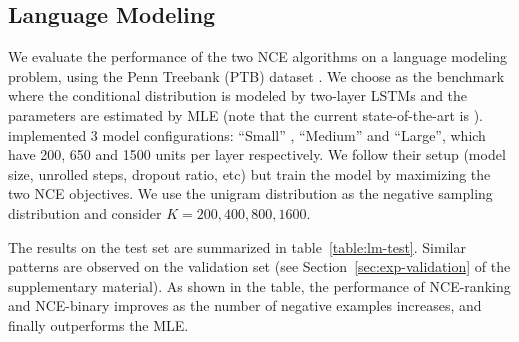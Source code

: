 \documentclass[11pt,a4paper]{article}
\newcommand{\commentout}[1]{}
\begin{document}
\subsection{Language Modeling}
\label{sec:lm}

We evaluate the performance of the two NCE algorithms on a language
modeling problem, using the Penn Treebank (PTB) dataset
\cite{marcus1993building}. 
We choose \cite{zaremba2014recurrent} as the benchmark where the
 conditional distribution is modeled by two-layer LSTMs and the parameters are estimated by MLE (note that the current state-of-the-art is \cite{yang2018breaking}). 
\citet{zaremba2014recurrent} implemented 3 model configurations:
``Small'' , ``Medium'' and ``Large'', which have 200, 650 and 1500
units per layer respectively. We follow their setup
(model size, unrolled steps, dropout ratio, etc) but train the model by maximizing the two
NCE objectives. We use the unigram distribution as the negative sampling distribution and consider $K=200, 400, 800, 1600$. 
\commentout{
The current state-of-art results were achieved by \cite{zaremba2014recurrent}
using two-layer recurrent neural networks with LSTM units and dropout.
\cite{zaremba2014recurrent} implemented 3 model configurations:
``Small'' , ``Medium'' and ``Large'', which have 200, 650 and 1500
units per layer respectively (see \citep{zaremba2014recurrent} for
more details).  These models are trained by maximizing the likelihood
function, which is computationally intensive.  We follow the setup
(model size, unrolled steps, dropout ratio, etc) of
\cite{zaremba2014recurrent} but train the model by maximizing the two
NCE objectives. We use the unigram distribution as the negative sampling distribution and consider $K=200, 400, 800, 1600$. }


The results on the test set are summarized in table~\ref{table:lm-test}. Similar patterns are observed on the validation set (see Section~\ref{sec:exp-validation} of the supplementary material). As shown in the table, the performance of NCE-ranking and NCE-binary improves as the number of negative examples increases, and finally outperforms the MLE. 
\end{document}
